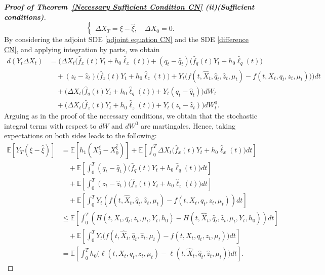 \documentclass[11pt,a4paper]{article}
\begin{document}
\begin{proof} [\textup{\textbf{Proof of Theorem~\ref{Necessary Sufficient Condition CN} (ii)(Sufficient conditions)}}]
\begin{equation}
\begin{cases}
  \Delta X_T=\xi-\hat \xi, \quad \Delta X_0 =0.
\end{cases}
 \end{equation} 
By considering the adjoint SDE \eqref{adjoint equation CN} and the SDE \eqref{difference CN}, and applying integration by parts, we obtain 
\begin{align*}
    d(Y_t\Delta X_t )
    & = \bigg(\Delta X_t \big(\hat f_x(t) Y_t+h_0 \hat \ell_x(t)\big)+ (q_t-\hat q_t )\big( \hat f_q(t) Y_t+h_0 \hat \ell_q(t)\big)\\
    &\quad +(z_t-\hat z_t) \big( \hat f_z(t) Y_t+h_0 \hat \ell_z(t)\big)
    + Y_t \big(f(t, \hat X_t, \hat q_t, \hat z_t, \mu_t)-f(t,  X_t, q_t, z_t, \mu_t)\big)\bigg)dt\\
    &\quad +\bigg(\Delta X_t \big(\hat f_q(t) Y_t+h_0 \hat \ell_q(t)\big)+Y_t( q_t-\hat q_t)\bigg) dW_t \\ 
    &\quad +\bigg(\Delta X_t\big(\hat f_z(t) Y_t+h_0 \hat \ell_z(t)\big)+Y_t(z_t-\hat z_t)\bigg) dW_t^0.
\end{align*}
Arguing as in the proof of the necessary conditions, we obtain that the stochastic integral terms with respect to $dW$ and $dW^0$ are martingales. Hence, taking expectations on both sides leads to the following:
\begin{align}
\mathbb E \left[ Y_T ( \xi-\hat \xi ) \right] & =\mathbb E\left[ h_1( X_0^\xi-X_0^{\hat \xi})\right]+\mathbb E \left[\int_0^T\Delta X_t\big(\hat f_x(t) Y_t+h_0 \hat \ell_x(t)\big)dt  \right] \nonumber \\
 & \quad +\mathbb E\left[\int_0^T(q_t-\hat q_t )\big( \hat f_q(t) Y_t+h_0 \hat \ell_q(t)\big)dt \right] \nonumber\\
 &\quad +\mathbb E \left[\int_0^T(z_t-\hat z_t) \big( \hat f_z(t) Y_t+h_0 \hat \ell_z(t)\big) dt\right] \nonumber\\
 & \quad +\mathbb E \left[\int_0^T Y_t( f(t, \hat X_t, \hat q_t, \hat z_t, \mu_t)-f(t,  X_t, q_t, z_t, \mu_t) ) dt \right] \nonumber\\
 &\leq \mathbb E \left[\int_0^T \left(H(t,X_t,  q_t, z_t, \mu_t, Y_t,h_0)-H(t,\hat X_t, \hat q_t, \hat z_t, \mu_t,  Y_t,h_0) \right)dt \right] \nonumber\\
 &\quad +\mathbb E \left[\int_0^T Y_t \Big(f(t, \hat X_t, \hat q_t, \hat z_t, \mu_t)- f(t,  X_t, q_t, z_t, \mu_t)  \Big) dt \right] \nonumber\\
 &=\mathbb E \left[\int_0^T h_0 \Big( \ell(t,  X_t, q_t, z_t, \mu_t) - \ell(t, \hat X_t, \hat q_t, \hat z_t, \mu_t) \Big) dt \right]. \label{ineq2}
\end{align}

\end{proof}
\end{document}
